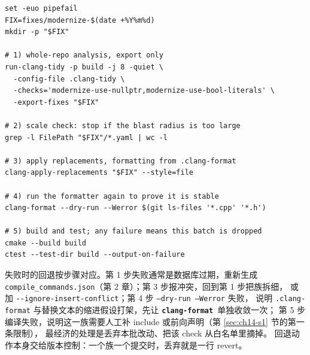 \documentclass[12pt,a4paper,fontset=fandol]{ctexbook}
\newcommand{\Opt}[1]{\texttt{-\/-#1}}
\newcommand{\Bk}{\discretionary{}{}{}}
\newcommand{\Lib}[1]{\textbf{\texttt{#1}}}
\newcommand{\Fmt}{\Lib{clang-format}}
\begin{document}
\begin{lstlisting}[style=shellstyle,caption={modernize 一批：导出、应用、格式化、编译、测试},label={lst:ch14-e2e}]
set -euo pipefail
FIX=fixes/modernize-$(date +%Y%m%d)
mkdir -p "$FIX"

# 1) whole-repo analysis, export only
run-clang-tidy -p build -j 8 -quiet \
  -config-file .clang-tidy \
  -checks='modernize-use-nullptr,modernize-use-bool-literals' \
  -export-fixes "$FIX"

# 2) scale check: stop if the blast radius is too large
grep -l FilePath "$FIX"/*.yaml | wc -l

# 3) apply replacements, formatting from .clang-format
clang-apply-replacements "$FIX" --style=file

# 4) run the formatter again to prove it is stable
clang-format --dry-run --Werror $(git ls-files '*.cpp' '*.h')

# 5) build and test; any failure means this batch is dropped
cmake --build build
ctest --test-dir build --output-on-failure
\end{lstlisting}

失败时的回退按步骤对应。第 1 步失败通常是数据库过期，重新生成
\texttt{compile\_{\Bk}commands.json}（第 2 章）；第 3 步报冲突，回到第 1 步把族拆细，
或加 \Opt{ignore-{\Bk}insert-{\Bk}conflict}；第 4 步 \texttt{--dry-{\Bk}run --Werror} 失败，
说明 \texttt{.clang-{\Bk}format} 与替换文本的缩进假设打架，先让 \Fmt\ 单独收敛一次；
第 5 步编译失败，说明这一族需要人工补 include 或前向声明（第 \ref{sec:ch14-s1} 节的第一条限制），
最经济的处理是丢弃本批改动、把该 check 从白名单里摘掉。
回退动作本身交给版本控制：一个族一个提交时，丢弃就是一行 revert。
\end{document}
